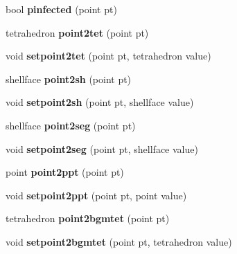 \begin{DoxyCompactItemize}
\item 
\hypertarget{classtetgenmesh_acc0db186d69dcdf785b49d6e709fed7b}{bool {\bfseries pinfected} (point pt)}\label{classtetgenmesh_acc0db186d69dcdf785b49d6e709fed7b}

\item 
\hypertarget{classtetgenmesh_a6c3e38cde82f108d0c0ca90d1a046931}{tetrahedron {\bfseries point2tet} (point pt)}\label{classtetgenmesh_a6c3e38cde82f108d0c0ca90d1a046931}

\item 
\hypertarget{classtetgenmesh_adcba3dbce598107f18e9990c733a20ed}{void {\bfseries setpoint2tet} (point pt, tetrahedron value)}\label{classtetgenmesh_adcba3dbce598107f18e9990c733a20ed}

\item 
\hypertarget{classtetgenmesh_a71c1fce651aaffe6e7db6c1f64f7f67d}{shellface {\bfseries point2sh} (point pt)}\label{classtetgenmesh_a71c1fce651aaffe6e7db6c1f64f7f67d}

\item 
\hypertarget{classtetgenmesh_a7f6bda7c35edc24c58af75365b42398c}{void {\bfseries setpoint2sh} (point pt, shellface value)}\label{classtetgenmesh_a7f6bda7c35edc24c58af75365b42398c}

\item 
\hypertarget{classtetgenmesh_a87a348f0b61dec737413461730507cc8}{shellface {\bfseries point2seg} (point pt)}\label{classtetgenmesh_a87a348f0b61dec737413461730507cc8}

\item 
\hypertarget{classtetgenmesh_aa9416c26733e050d0204627e169a0175}{void {\bfseries setpoint2seg} (point pt, shellface value)}\label{classtetgenmesh_aa9416c26733e050d0204627e169a0175}

\item 
\hypertarget{classtetgenmesh_aec54de533203c1b8371a085c1a8b9783}{point {\bfseries point2ppt} (point pt)}\label{classtetgenmesh_aec54de533203c1b8371a085c1a8b9783}

\item 
\hypertarget{classtetgenmesh_a1a212c15e5f467b3baf68cd79217ed99}{void {\bfseries setpoint2ppt} (point pt, point value)}\label{classtetgenmesh_a1a212c15e5f467b3baf68cd79217ed99}

\item 
\hypertarget{classtetgenmesh_a3cb62ec0ca76c3f770e82620151b2398}{tetrahedron {\bfseries point2bgmtet} (point pt)}\label{classtetgenmesh_a3cb62ec0ca76c3f770e82620151b2398}

\item 
\hypertarget{classtetgenmesh_a28fee8bde806c0943c547c942d345720}{void {\bfseries setpoint2bgmtet} (point pt, tetrahedron value)}\label{classtetgenmesh_a28fee8bde806c0943c547c942d345720}


\end{DoxyCompactItemize}
